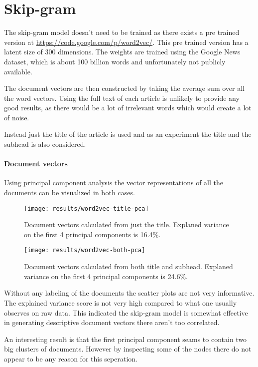\section{Skip-gram}

The skip-gram model doesn't need to be trained as there exists a pre trained version at \url{https://code.google.com/p/word2vec/}. This pre trained version has a latent size of 300 dimensions. The weights are trained using the Google News dataset, which is about 100 billion words and unfortunately not publicly available.

The document vectors are then constructed by taking the average sum over all the word vectors. Using the full text of each article is unlikely to provide any good results, as there would be a lot of irrelevant words which would create a lot of noise. 

Instead just the title of the article is used and as an experiment the title and the subhead is also considered.

\paragraph{Document vectors} Using principal component analysis the vector representations of all the documents can be visualized in both cases.
\begin{figure}[H]
	\centering
	\texttt{[image: results/word2vec-title-pca]}
	\caption{Document vectors calculated from just the title. Explaned variance on the first 4 principal components is 16.4\%.}
\end{figure}

\begin{figure}[H]
	\centering
	\texttt{[image: results/word2vec-both-pca]}
	\caption{Document vectors calculated from both title and subhead. Explaned variance on the first 4 principal components is 24.6\%.}
\end{figure}

Without any labeling of the documents the scatter plots are not very informative. The explained variance score is not very high compared to what one usually observes on raw data. This indicated the skip-gram model is somewhat effective in generating descriptive document vectors there aren't too correlated.

An interesting result is that the first principal component seams to contain two big clusters of documents. However by inspecting some of the nodes there do not appear to be any reason for this seperation.


